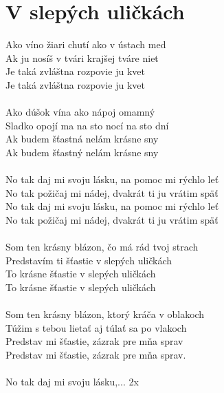 \section{V slepých uličkách}
\color{blue}
\textcolor{black}{}Ako víno žiari chutí ako v ústach \textcolor{black}{}med\\
\textcolor{black}{}Ak ju nosíš v tvári krajšej tváre \textcolor{black}{}niet\\
Je taká \textcolor{black}{}zvláštna rozpovie ju \textcolor{black}{}kvet\\
Je taká \textcolor{black}{}zvláštna rozpovie ju \textcolor{black}{}kvet\\
\\
\color{red}
Ako dúšok vína ako nápoj omamný\\
Sladko opojí ma na sto nocí na sto dní\\
Ak budem šťastná nelám krásne sny\\
\color{blue}
Ak budem šťastný nelám krásne sny\\
\\
\color{black}
No tak daj mi svoju lásku, na pomoc mi rýchlo leť\\
No tak požičaj mi nádej, dvakrát ti ju vrátim späť\\
No tak daj mi svoju lásku, na pomoc mi rýchlo leť\\
No tak požičaj mi nádej, dvakrát ti ju vrátim späť\\
\\
\color{blue}
Som ten krásny blázon, čo má rád tvoj strach\\
Predstavím ti šťastie v slepých uličkách\\
To krásne šťastie v slepých uličkách\\
To krásne šťastie v slepých uličkách\\
\\
\color{red}
Som ten krásny blázon, ktorý kráča v oblakoch\\
Túžim s tebou lietať aj túlať sa po vlakoch\\
Predstav mi šťastie, zázrak pre mňa sprav\\
\color{blue}
Predstav mi šťastie, zázrak pre mňa sprav.\\
\\
\color{black}
No tak daj mi svoju lásku,... 2x\\\